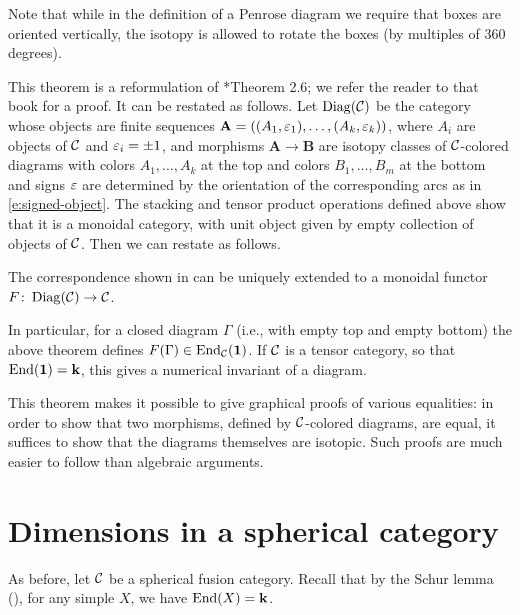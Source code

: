 Note that while in the definition of a Penrose diagram we require that boxes
are oriented vertically, the isotopy is allowed to rotate the boxes (by
multiples of 360 degrees).

This theorem is a reformulation of *{Theorem 2.6}; we
refer the reader to that book for a proof. It can
be restated as follows. Let $\operatorname{Diag}(\mathcal{C})$ be the category whose objects are finite
sequences $\mathbf{A}=((A_1, \varepsilon_1), \dots, (A_k, \varepsilon_k))$, where $A_i$ are
objects of $\mathcal{C}$ and $\varepsilon_i=\pm 1$, and morphisms $\mathbf{A}\to \mathbf{B}$
are isotopy classes of $\mathcal{C}$-colored diagrams with colors $A_1, \dots, A_k$ at
the top and colors $B_1, \dots, B_m$ at the bottom and signs $\varepsilon$ are
determined by the orientation of the corresponding arcs as in
\eqref{e:signed-object}. The stacking and tensor product operations defined
above show that it is a monoidal category, with unit object given by empty
collection of objects of $\mathcal{C}$. Then we can restate
 as follows.

\begin{theorem}\label{t:graphical-calculus2}
  The correspondence shown in  can be uniquely extended to
  a monoidal functor $F\colon \operatorname{Diag}(\mathcal{C})\to \mathcal{C}$.
\end{theorem}


In particular, for a closed diagram $\Gamma$ (i.e., with empty top and empty
bottom) the above theorem defines $F(\Gamma)\in \operatorname{End}_{\mathcal{C}}(\mathbf{1})$. If $\mathcal{C}$
is a tensor category, so that $\operatorname{End}(\mathbf{1})=\mathbf{k}$, this gives a numerical invariant
of a diagram.

This theorem makes it possible to give graphical proofs of various equalities:
in order to show that two morphisms, defined by $\mathcal{C}$-colored diagrams, are
equal, it suffices to show that the diagrams themselves are isotopic. Such
proofs are much easier to follow than algebraic arguments.






\section{Dimensions in a spherical category}\label{s:spherical-basic}

As before, let $\mathcal{C}$ be a spherical fusion category.
Recall that by the Schur lemma (),
for any simple $X$, we have $\operatorname{End}(X)=\mathbf{k}$.

